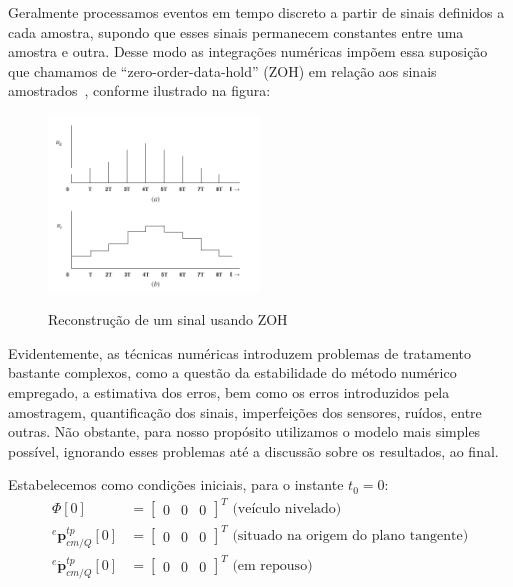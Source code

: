 Geralmente processamos eventos em tempo discreto a partir de sinais definidos a cada amostra, supondo que esses sinais permanecem constantes entre uma amostra e outra. Desse modo as integrações numéricas impõem essa suposição que chamamos de ``zero-order-data-hold'' (ZOH) em relação aos sinais amostrados~\cite{Stevens2016}, conforme ilustrado na figura:
\begin{figure}[H]
    \centering
    \includegraphics[width=0.5\textwidth, keepaspectratio]{figuras/figure7.2-2.png}\label{fig7.2-2}
    \caption{Reconstrução de um sinal usando ZOH}\label{fig:ZOH}
\end{figure}

Evidentemente, as técnicas numéricas introduzem problemas de tratamento bastante complexos, como a questão da estabilidade do método numérico empregado, a estimativa dos erros, bem como os erros introduzidos pela amostragem, quantificação dos sinais, imperfeições dos sensores, ruídos, entre outras. Não obstante, para nosso propósito utilizamos o modelo mais simples possível, ignorando esses problemas até a discussão sobre os resultados, ao final.

Estabelecemos como condições iniciais, para o instante \(t_{0} = 0\):
\begin{align*}
    {\Phi} \left[0\right] 
        &= \begin{bmatrix} 0 & 0 & 0 \end{bmatrix}^{T} \text{ (veículo nivelado)} \\
    {^{e}{\mathbf{p}^{tp}_{cm/Q}}\left[0\right]}
    &= \begin{bmatrix} 0 & 0 & 0 \end{bmatrix}^{T} \text{ (situado na origem do plano tangente)} \\
    {^{e}{\dot{\mathbf{p}}^{tp}_{cm/Q}}\left[0\right]}
    &= \begin{bmatrix} 0 & 0 & 0 \end{bmatrix}^{T} \text{ (em repouso)} \\
\end{align*}

